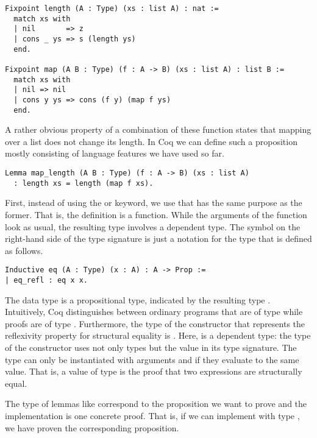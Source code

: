 \begin{verbatim}
Fixpoint length (A : Type) (xs : list A) : nat :=
  match xs with
  | nil       => z
  | cons _ ys => s (length ys)
  end.

Fixpoint map (A B : Type) (f : A -> B) (xs : list A) : list B :=
  match xs with
  | nil => nil
  | cons y ys => cons (f y) (map f ys)
  end.
\end{verbatim}

A rather obvious property of a combination of these function states that mapping over a list does not change its length.
In Coq we can define such a proposition mostly consisting of language features we have used so far.

\begin{verbatim}
Lemma map_length (A B : Type) (f : A -> B) (xs : list A)
  : length xs = length (map f xs).
\end{verbatim}

First, instead of using the  or  keyword, we use  that has the same purpose as the former.
That is, the definition  is a function.
While the arguments of the function  look as usual, the resulting type involves a dependent type.
The symbol \cinl{=} on the right-hand side of the type signature is just a notation for the type  that is defined as follows.

\begin{verbatim}
Inductive eq (A : Type) (x : A) : A -> Prop :=
| eq_refl : eq x x.
\end{verbatim}

The data type  is a propositional type, indicated by the resulting type .
Intuitively, Coq distinguishes between ordinary programs that are of type  while proofs are of type .
Furthermore, the type of the constructor  that represents the reflexivity property for structural equality is .
Here,  is a dependent type: the type of the constructor  uses not only types but the value  in its type signature.
The type  can only be instantiated with arguments  and  if they evaluate to the same value.
That is, a value of type  is the proof that two expressions are structurally equal.

The type of lemmas like  correspond to the proposition we want to prove and the implementation is one concrete proof.
That is, if we can implement  with type , we have proven the corresponding proposition.

